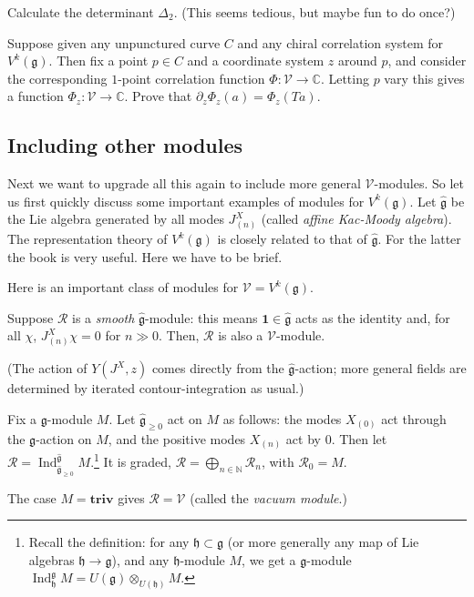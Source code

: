 \documentclass[12pt,letterpaper,reqno]{amsart}
\numberwithin{equation}{section}
\newcommand{\fg}{{\mathfrak g}}
\newcommand{\fh}{{\mathfrak h}}
\newcommand{\hfg}{{\widehat\fg}}
\newcommand{\bbC}{\ensuremath{\mathbb C}}
\newcommand{\bbN}{{\mathbb N}}
\newcommand\bid{{\mathbf 1}}
\newcommand\triv{{\mathbf {triv}}}
\newcommand{\vertex}{\mathcal{V}}
\newcommand{\vrep}{\mathcal{R}}
\newcommand{\ti}[1]{\textit{#1}}
\DeclareMathOperator{\Ind}{Ind}
\begin{document}
\begin{exercise} Calculate the determinant $\Delta_2$. (This seems tedious, but maybe fun to do once?)
\end{exercise}

\begin{exercise} Suppose given any unpunctured curve $C$ and any chiral correlation system for $V^k(\fg)$.
Then fix a point $p \in C$ and a coordinate system $z$ around $p$,
and consider the corresponding $1$-point correlation function $\Phi: \vertex \to \bbC$.
Letting $p$ vary this gives a function $\Phi_z: \vertex \to \bbC$.
Prove that $\partial_z \Phi_z(a) = \Phi_z(T a)$.
\end{exercise}


\subsection{Including other modules}

Next we want to upgrade all this again to include more general $\vertex$-modules.
So let us first quickly discuss some important examples of modules for $V^k(\fg)$.
Let $\hfg$ be the Lie algebra generated by all modes $J^X_{(n)}$ (called \ti{affine Kac-Moody algebra}).
The representation theory of $V^k(\fg)$ is closely related to that of $\hfg$.
For the latter the book \cite{Kac1990InfiniteDimensionalLieAlgebras} is very useful. Here we
have to be brief.

Here is an important class of modules for
$\vertex = V^k(\fg)$.
\begin{prop}
Suppose $\vrep$ is a \ti{smooth} $\hfg$-module: this means 
$\bid \in \hat\fg$ acts as the identity
and, for all $\chi$, $J^X_{(n)} \chi = 0$ for $n \gg 0$.
Then, $\vrep$ is also a $\vertex$-module.
\end{prop}
(The action of $Y(J^X, z)$ comes directly from the $\hat\fg$-action; 
more general fields are determined by iterated contour-integration
as usual.)

\begin{example} \label{exa:parabolic-verma-module}
Fix a $\fg$-module $M$. Let
$\hfg_{\ge 0}$ act on $M$ as follows:
the modes $X_{(0)}$ act through the $\fg$-action on $M$,
and the positive modes $X_{(n)}$ act by $0$.
Then let 
$\vrep = \Ind^{\hfg}_{\hfg_{\ge 0}} M$.\footnote{Recall the definition: for any $\fh \subset \fg$ (or more generally
any map of Lie algebras $\fh \to \fg$), and any $\fh$-module $M$, we get a $\fg$-module $\Ind_\fh^\fg M = U(\fg) \otimes_{U(\fh)} M$.}
It is graded, $\vrep = \bigoplus_{n \in \bbN} \vrep_n$, with $\vrep_0 = M$.

The case $M = \triv$ gives $\vrep = \vertex$ (called the \ti{vacuum module}.)
\end{example}
\end{document}
